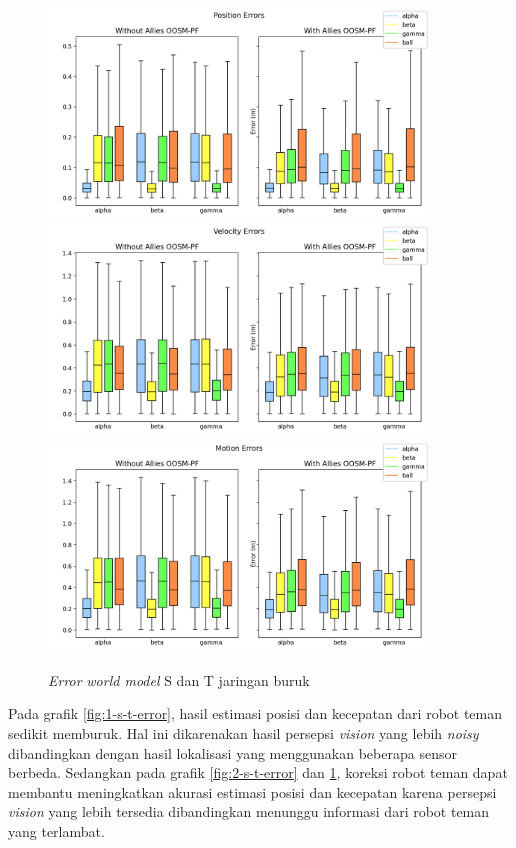 \begin{figure}[p]
    \centering
    \medskip
    \includegraphics[width=0.9\textwidth]{resources/cfg3_AS_AT_error_pos.png}
    \includegraphics[width=0.9\textwidth]{resources/cfg3_AS_AT_error_vel.png}
    \includegraphics[width=0.9\textwidth]{resources/cfg3_AS_AT_error_motion.png}
    \caption{\textit{Error} \textit{world model} S dan T jaringan buruk}
    \label{fig:3-s-t-error}
    \bigskip
\end{figure}

Pada grafik \ref{fig:1-s-t-error}, hasil estimasi posisi dan kecepatan dari robot teman sedikit memburuk. Hal ini dikarenakan hasil persepsi \textit{vision} yang lebih \textit{noisy} dibandingkan dengan hasil lokalisasi yang menggunakan beberapa sensor berbeda. Sedangkan pada grafik \ref{fig:2-s-t-error} dan \ref{fig:3-s-t-error}, koreksi robot teman dapat membantu meningkatkan akurasi estimasi posisi dan kecepatan karena persepsi \textit{vision} yang lebih tersedia dibandingkan menunggu informasi dari robot teman yang terlambat.
